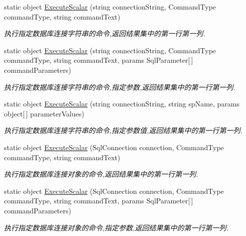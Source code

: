\begin{DoxyCompactItemize}
static object \hyperlink{class_x_c_l_net_tools_1_1_data_base_1_1_m_s_s_q_l_1_1_sql_helper_aafc07aaf3567b5a7b438d6df330edb9e}{Execute\-Scalar} (string connection\-String, Command\-Type command\-Type, string command\-Text)
\begin{DoxyCompactList}\small\item\em 执行指定数据库连接字符串的命令,返回结果集中的第一行第一列. \end{DoxyCompactList}\item 
static object \hyperlink{class_x_c_l_net_tools_1_1_data_base_1_1_m_s_s_q_l_1_1_sql_helper_abad3af8ca3ebffe104c01485eb220bbc}{Execute\-Scalar} (string connection\-String, Command\-Type command\-Type, string command\-Text, params Sql\-Parameter\mbox{[}$\,$\mbox{]} command\-Parameters)
\begin{DoxyCompactList}\small\item\em 执行指定数据库连接字符串的命令,指定参数,返回结果集中的第一行第一列. \end{DoxyCompactList}\item 
static object \hyperlink{class_x_c_l_net_tools_1_1_data_base_1_1_m_s_s_q_l_1_1_sql_helper_adce1e673c1866939633656ba3de9dd9a}{Execute\-Scalar} (string connection\-String, string sp\-Name, params object\mbox{[}$\,$\mbox{]} parameter\-Values)
\begin{DoxyCompactList}\small\item\em 执行指定数据库连接字符串的命令,指定参数值,返回结果集中的第一行第一列. \end{DoxyCompactList}\item 
static object \hyperlink{class_x_c_l_net_tools_1_1_data_base_1_1_m_s_s_q_l_1_1_sql_helper_aa8413d019d1b830ba7c3028da1e506e1}{Execute\-Scalar} (Sql\-Connection connection, Command\-Type command\-Type, string command\-Text)
\begin{DoxyCompactList}\small\item\em 执行指定数据库连接对象的命令,返回结果集中的第一行第一列. \end{DoxyCompactList}\item 
static object \hyperlink{class_x_c_l_net_tools_1_1_data_base_1_1_m_s_s_q_l_1_1_sql_helper_a6841f23db7428756872e80eb545c0d3e}{Execute\-Scalar} (Sql\-Connection connection, Command\-Type command\-Type, string command\-Text, params Sql\-Parameter\mbox{[}$\,$\mbox{]} command\-Parameters)
\begin{DoxyCompactList}\small\item\em 执行指定数据库连接对象的命令,指定参数,返回结果集中的第一行第一列. \end{DoxyCompactList}\item 

\end{DoxyCompactItemize}
